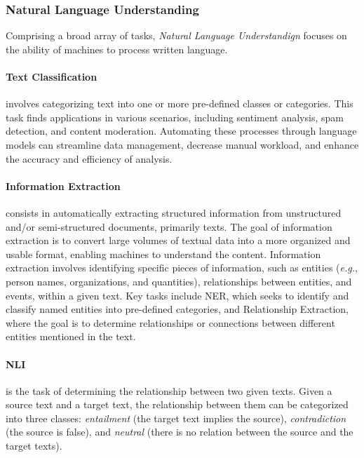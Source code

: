 \subsubsection{Natural Language Understanding}

Comprising a broad array of tasks, \textit{Natural Language Understandign} focuses on the ability of machines to process written language. 

\paragraph{Text Classification} involves categorizing text into one or more pre-defined classes or categories. This task finds applications in various scenarios, including sentiment analysis, spam detection, and content moderation. Automating these processes through language models can streamline data management, decrease manual workload, and enhance the accuracy and efficiency of analysis. 

\paragraph{Information Extraction} consists in automatically extracting structured information from unstructured and/or semi-structured documents, primarily texts. The goal of information extraction is to convert large volumes of textual data into a more organized and usable format, enabling machines to  understand the content. Information extraction involves identifying specific pieces of information, such as entities (\textit{e.g.}, person names, organizations, and quantities), relationships between entities, and events, within a given text. Key tasks include \ac{NER}, which seeks to identify and classify named entities into pre-defined categories, and Relationship Extraction, where the goal is to determine relationships or connections between different entities mentioned in the text. 

\paragraph{\ac{NLI}} is the task of determining the relationship between two given texts. Given a source text and a target text, the relationship between them can be categorized into three classes: \textit{entailment} (the target text implies the source), \textit{contradiction} (the source is false), and \textit{neutral} (there is no relation between the source and the target texts).

